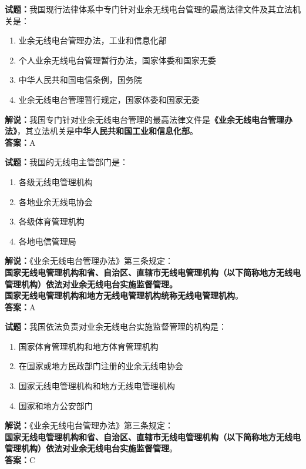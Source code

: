 \documentclass{ctexbook}
\begin{document}
\noindent\textbf{试题：}我国现行法律体系中专门针对业余无线电台管理的最高法律文件及其立法机关是：
\begin{enumerate}[leftmargin=3em]
\item 业余无线电台管理办法，工业和信息化部
\item 个人业余无线电台管理暂行办法，国家体委和国家无委
\item 中华人民共和国电信条例，国务院
\item 业余无线电台管理暂行规定，国家体委和国家无委
\end{enumerate}
\noindent\textbf{解说：}我国专门针对业余无线电台管理的最高法律文件是\textbf{《业余无线电台管理办法》}，其立法机关是\textbf{中华人民共和国工业和信息化部}。\\\noindent\textbf{答案：}A

\bigskip


\noindent\textbf{试题：}我国的无线电主管部门是：
\begin{enumerate}[leftmargin=3em]
\item 各级无线电管理机构
\item 各地业余无线电协会
\item 各级体育管理机构
\item 各地电信管理局
\end{enumerate}
\noindent\textbf{解说：}《业余无线电台管理办法》第三条规定：\\\textbf{国家无线电管理机构和省、自治区、直辖市无线电管理机构（以下简称地方无线电管理机构）依法对业余无线电台实施监督管理。\\
国家无线电管理机构和地方无线电管理机构统称无线电管理机构}。\\\noindent\textbf{答案：}A

\bigskip


\noindent\textbf{试题：}我国依法负责对业余无线电台实施监督管理的机构是：
\begin{enumerate}[leftmargin=3em]
\item 国家体育管理机构和地方体育管理机构
\item 在国家或地方民政部门注册的业余无线电协会
\item 国家无线电管理机构和地方无线电管理机构
\item 国家和地方公安部门
\end{enumerate}
\noindent\textbf{解说：}《业余无线电台管理办法》第三条规定：\\\textbf{国家无线电管理机构和省、自治区、直辖市无线电管理机构（以下简称地方无线电管理机构）依法对业余无线电台实施监督管理}。\\\noindent\textbf{答案：}C
\end{document}
